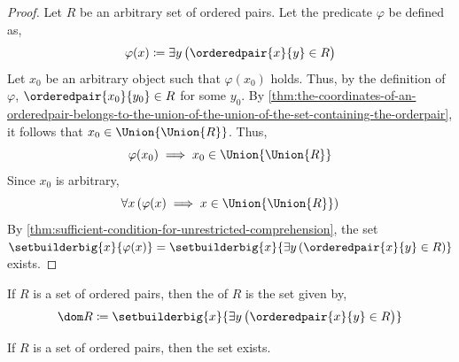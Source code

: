 \begin{proof}
    Let \( R \) be an arbitrary set of ordered pairs. Let the predicate \( \varphi \) be defined as,
    \begin{equation*}
        \varphi(x) \coloneq \exists y \, \big( \orderedpair{x}{y} \in R \big)
    \end{equation*}
    Let \( x_{0} \) be an arbitrary object such that \( \varphi(x_{0}) \) holds. Thus, by the definition of \( \varphi \),
    \( \orderedpair{x_{0}}{y_{0}} \in R \) for some \( y_{0} \).
    By \cref{thm:the-coordinates-of-an-orderedpair-belongs-to-the-union-of-the-union-of-the-set-containing-the-orderpair},
    it follows that \( x_{0} \in \Union{\Union{R}} \). Thus,
    \begin{equation*}
        \varphi(x_{0}) \implies x_{0} \in \Union{\Union{R}}
    \end{equation*}
    Since \( x_{0} \) is arbitrary,
    \begin{equation*}
        \forall x \, \mleft( \varphi(x) \implies x \in \Union{\Union{R}} \mright)
    \end{equation*}
    By \cref{thm:sufficient-condition-for-unrestricted-comprehension},
    the set \( \setbuilderbig{x}{\varphi(x)} = \setbuilderbig{x}{\exists y \, \mleft( \orderedpair{x}{y} \in R \mright)} \)
    exists.
\end{proof}

\begin{dfn}[Domain]
    \label{dfn:domain-of-a-set-of-ordered-pairs}
    If \( R \) is a set of ordered pairs, then the  of \( R \) is the set given by,
    \begin{equation*}
        \dom R \coloneq \setbuilderbig{x}{\exists y \, \big(\orderedpair{x}{y} \in R\big)}
    \end{equation*}
\end{dfn}

\begin{thm}
    \label{thm:existence-of-the-range-of-a-set-of-ordered-pairs}
    If \( R \) is a set of ordered pairs, then the set
     exists.
\end{thm}

